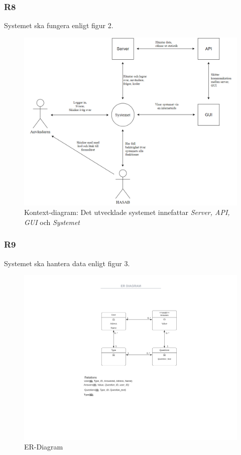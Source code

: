 \documentclass{article}
\begin{document}
    \subsubsection*{R8}
    Systemet ska fungera enligt figur 2.
    
    \begin{figure}[h!]
    \caption{Kontext-diagram: Det utvecklade systemet innefattar \textit{Server, API, GUI} och \textit{Systemet}}
    \includegraphics[width=150mm]{Kontextdiagram.png}
    
    \end{figure}
    
    \newpage
    \subsubsection*{R9}
    Systemet ska hantera data enligt figur 3.
       \begin{figure}[h!]
    
    \includegraphics[width=150mm]{ERDIAGRAM.png}
    \caption{ER-Diagram}
    \end{figure}
    
\end{document}
